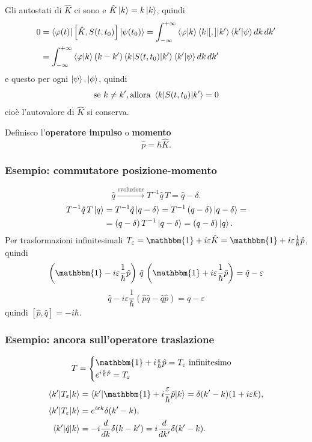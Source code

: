 \bigskip
\noindent
Gli autostati di  \( \hat{K} \) ci sono e \( \hat{K} \ket{k} = k \ket{k} \), quindi
\begin{align*}
0 &= \braket{\varphi(t)|\left[ \hat{K}, S(t, t_0) \right]|\psi(t_0)} = \int_{-\infty}^{+\infty} \braket{\varphi|k} \braket{k|[,]|k^\prime} \braket{k^\prime|\psi} dk \, dk^\prime \\
&= \int_{-\infty}^{+\infty} \braket{\varphi|k} \left( k - k^\prime \right) \braket{k|S(t, t_0)|k^\prime} \braket{k^\prime|\psi} dk \, dk^\prime
\end{align*}
e questo per ogni \(\ket{\psi}, \ket{\phi}\), quindi
\[
\text{se } k \neq k^\prime, \text{allora } \braket{k|S(t, t_0)|k^\prime} = 0
\]
cioè l'autovalore di \( \hat{K} \) si conserva.

\bigskip
\noindent
Definisco l'\textbf{operatore impulso} o \textbf{momento}
\[
\hat{p} = \hbar \hat{K}.
\]

\subsubsection{Esempio: commutatore posizione-momento}
\[
\hat{q} \xrightarrow{\text{evoluzione}} T^{-1} \hat{q} \, T = \hat{q} - \delta.
\]
\begin{align*}
T^{-1} \hat{q} \, T \ket{q} &= T^{-1} \hat{q} \ket{q - \delta} = T^{-1} \left( q - \delta \right) \ket{q - \delta} = \\
&= \left( q - \delta \right) T^{-1} \ket{q - \delta} = \left( q - \delta \right) \ket{q}.
\end{align*}
Per trasformazioni infinitesimali \( T_\varepsilon = \mathbbm{1} + i \varepsilon \hat{K} = \mathbbm{1} + i \varepsilon \frac{1}{\hbar} \hat{p} \), quindi
\[
\left( \mathbbm{1} - i \varepsilon \frac{1}{\hbar} \hat{p} \right) \, \hat{q} \, \left( \mathbbm{1} + i \varepsilon \frac{1}{\hbar} \hat{p} \right) = \hat{q} - \varepsilon
\]
\[
\hat{q} - i \varepsilon \frac{1}{\hbar} \left( \hat{p} \hat{q} - \hat{q} \hat{p} \right) = \hat{q} - \varepsilon
\]
quindi  \( \left[ \hat{p}, \hat{q} \right] = -i \hbar \).

\subsubsection{Esempio: ancora sull'operatore traslazione}
\[
T = \begin{cases}
\mathbbm{1} + i \frac{\varepsilon}{\hbar} \hat{p} = T_\varepsilon \text{ infinitesimo} \\
e^{i \frac{\varepsilon}{\hbar} \hat{p}} = T_\varepsilon
\end{cases}
\]
\begin{align*}
\braket{k'|T_\varepsilon|k} &= \braket{k'|\mathbbm{1} + i \frac{\varepsilon}{\hbar} \hat{p}|k} = \delta(k' - k) (1 + i \varepsilon k), \\
\braket{k'|T_\varepsilon|k} &= e^{i \varepsilon k} \delta(k' - k), \\
\braket{k'|\hat{q}|k} &= - i \frac{d}{dk} \delta(k - k') = i \frac{d}{dk'} \delta(k' - k).
\end{align*}